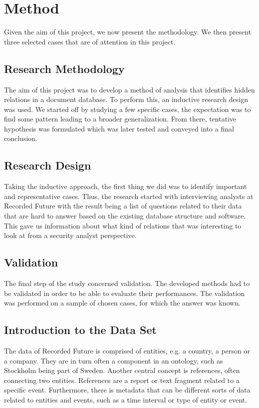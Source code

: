 \chapter{Method}
Given the aim of this project, we now present the methodology. We then present three selected cases that are of attention in this project.

\section{Research Methodology}
The aim of this project was to develop a method of analysis that identifies hidden relations in a document database. To perform this, an inductive research design was used. We started off by studying a few specific cases, the expectation was to find some pattern leading to a broader generalization. From there, tentative hypothesis was formulated which was later tested and conveyed into a final conclusion.

\section{Research Design}
Taking the inductive approach, the first thing we did was to identify important and representative cases. Thus, the research started with interviewing analysts at Recorded Future with the result being a list of questions related to their data that are hard to answer based on the existing database structure and software. This gave us information about what kind of relations that was interesting to look at from a security analyst perspective.

\section{Validation} 
The final step of the study concerned validation. The developed methods had to be validated in order to be able to evaluate their performances. The validation was performed on a sample of chosen cases, for which the answer was known.

\section{Introduction to the Data Set \label{dataset}}
The data of Recorded Future is comprised of entities, e.g. a country, a person or a company. They are in turn often a component in an ontology, such as Stockholm being part of Sweden. Another central concept is references, often connecting two entities. References are a report or text fragment related to a specific event. Furthermore, there is metadata that can be different sorts of data related to entities and events, such as a time interval or type of entity or event.

